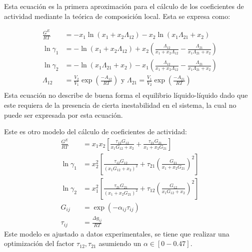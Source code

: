 Esta ecuación es la primera aproximación para el cálculo de los coeficientes de actividad mediante la teórica de composición local. Esta se expresa como:

\begin{align}
    \frac{G^{E}}{R T}&=-x_{1} \ln \left(x_{1}+x_{2} \Lambda_{12}\right)-x_{2} \ln \left(x_{1} \Lambda_{21}+x_{2}\right)\\
    \ln \gamma_{1}&=-\ln \left(x_{1}+x_{2} \Lambda_{12}\right)+x_{2}\left(\frac{\Lambda_{12}}{x_{1}+x_{2} \Lambda_{12}}-\frac{\Lambda_{21}}{x_{1} \Lambda_{21}+x_{2}}\right)\\
    \ln \gamma_{2}&=-\ln \left(x_{1} \Lambda_{21}+x_{2}\right)-x_{1}\left(\frac{\Lambda_{12}}{x_{1}+x_{2} \Lambda_{12}}-\frac{\Lambda_{21}}{x_{1} \Lambda_{21}+x_{2}}\right)\\
    \Lambda_{12}&=\frac{V_{2}}{V_{1}} \exp \left(\frac{-A_{12}}{R T}\right) \text{ y } \Lambda_{21}=\frac{V_{1}}{V_{2}} \exp \left(\frac{-A_{21}}{R T}\right)\\
\end{align}
Esta ecuación no describe de buena forma el equilibrio líquido-líquido dado que este requiera de la presencia de cierta inestabilidad en el sistema, la cual no puede ser expresada por esta ecuación.


Este es otro modelo del cálculo de coeficientes de actividad:
\begin{align}
    \frac{G^{E}}{R T}&=x_{1} x_{2}\left[\frac{\tau_{12} G_{12}}{x_{1} G_{12}+x_{2}}+\frac{\tau_{21} G_{21}}{x_{1}+x_{2} G_{21}}\right] \\
    \ln \gamma_{1}&=x_{2}^{2}\left[\frac{\tau_{12} G_{12}}{\left(x_{1} G_{12}+x_{2}\right)^{2}}+\tau_{21}\left(\frac{G_{21}}{x_{1}+x_{2} G_{21}}\right)^{2}\right]\\
    \ln \gamma_{2}&=x_{1}^{2}\left[\frac{\tau_{21} G_{21}}{\left(x_{1}+x_{2} G_{21}\right)^{2}}+\tau_{12}\left(\frac{G_{12}}{x_{1} G_{12}+x_{2}}\right)^{2}\right]\\
    G_{i j}&=\exp \left(-\alpha_{i j} \tau_{i j}\right)\\
    \tau_{i j}&=\frac{\Delta g_{i j}}{R T}
\end{align}
Este modelo es ajustado a datos experimentales, se tiene que realizar una optimización del factor $\tau_{12},\tau_{21}$ asumiendo un $\alpha \in [0-0.47]$.


